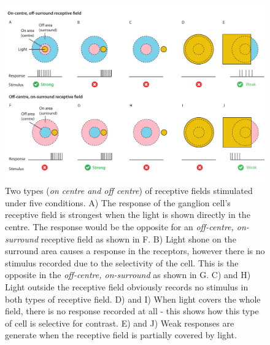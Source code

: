 \begin{figure}[t!]
\centering
\includegraphics[width=\textwidth]{images/related-work/receptive-field}
\caption{Two types (\emph{on centre and off centre}) of receptive fields stimulated under five conditions. 
A) The response of the ganglion cell's receptive field is strongest when the light is shown directly in the centre. 
The response would be the opposite for an \emph{off-centre, on-surround} receptive field as shown in F. 
B) Light shone on the surround area causes a response in the receptors, however there is no stimulus recorded due to the selectivity of the cell. This is the opposite in the \emph{off-centre, on-surround} as shown in G. 
C) and H) Light outside the receptive field obviously records no stimulus in both types of receptive field. 
D) and I) When light covers the whole field, there is no response recorded at all - this shows how this type of cell is selective for contrast. 
E) and J) Weak responses are generate when the receptive field is partially covered by light.} 
\label{fig:receptive-fields}
\end{figure}

